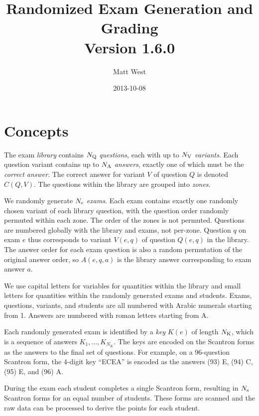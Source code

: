 \documentclass{article}
\begin{document}
\title{Randomized Exam Generation and Grading\\[0.5em] Version 1.6.0}
\author{Matt West}
\date{2013-10-08}
\maketitle

\section{Concepts}

The exam \emph{library} contains $N_{\rm Q}$ \emph{questions}, each
with up to $N_{\rm V}$ \emph{variants}. Each question variant contains
up to $N_{\rm A}$ \emph{answers}, exactly one of which must be the
\emph{correct answer}. The correct answer for variant $V$ of question
$Q$ is denoted $C(Q,V)$. The questions within the library are grouped
into \emph{zones}.

We randomly generate $N_{\rm e}$ \emph{exams}. Each exam contains
exactly one randomly chosen variant of each library question, with the
question order randomly permuted within each zone. The order of the
zones is not permuted. Questions are numbered globally with the
library and exams, not per-zone. Question $q$ on exam $e$ thus
corresponds to variant $V(e,q)$ of question $Q(e,q)$ in the
library. The answer order for each exam question is also a random
permutation of the original answer order, so $A(e,q,a)$ is the library
answer corresponding to exam answer $a$.

We use capital letters for variables for quantities within the library
and small letters for quantities within the randomly generated exams
and students. Exams, questions, variants, and students are all
numbered with Arabic numerals starting from 1. Answers are numbered
with roman letters starting from A.

Each randomly generated exam is identified by a \emph{key} $K(e)$ of
length $N_{\rm K}$, which is a sequence of answers
$K_1,\ldots,K_{N_K}$. The keys are encoded on the Scantron forms as
the answers to the final set of questions. For example, on a
96-question Scantron form, the 4-digit key ``ECEA'' is encoded as the
answers (93) E, (94) C, (95) E, and (96) A.

During the exam each student completes a single Scantron form,
resulting in $N_{\rm s}$ Scantron forms for an equal number of
students. These forms are scanned and the raw data can be processed to
derive the points for each student.
\end{document}
